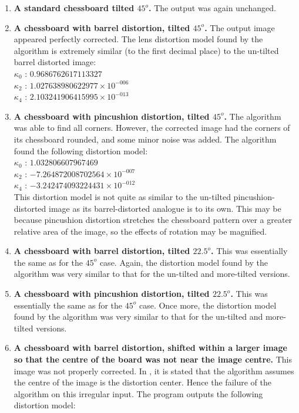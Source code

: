 \begin{enumerate}
  \item \textbf{A standard chessboard tilted $45^o$.} The output was again unchanged.
  \item \textbf{A chessboard with barrel distortion, tilted $45^o$.} The output image appeared perfectly corrected. The lens distortion model found by the algorithm is extremely similar (to the first decimal place) to the un-tilted barrel distorted image:\\
   $ \kappa_{0}$ : $0.9686762617113327$\\
   $ \kappa_{2}$ : $1.027638980622977 \times 10^{-006}$\\
   $ \kappa_{4}$ : $2.103241906415995 \times 10^{-013}$
  \item \textbf{A chessboard with pincushion distortion, tilted $45^o$.} The algorithm was able to find all corners. However, the corrected image had the corners of its chessboard rounded, and some minor noise was added. The algorithm found the following distortion model:\\
   $ \kappa_{0}$ : $1.032806607967469$\\
   $ \kappa_{2}$ : $-7.264872008702564 \times 10^{-007}$\\
   $ \kappa_{4}$ : $-3.242474093224431 \times 10^{-012}$\\
   This distortion model is not quite as similar to the un-tilted pincushion-distorted image as its barrel-distorted analogue is to its own. This may be because pincushion distortion stretches the chessboard pattern over a greater relative area of the image, so the effects of rotation may be magnified.
  \item \textbf{A chessboard with barrel distortion, tilted $22.5^o$.} This was essentially the same as for the $45^o$ case. Again, the distortion model found by the algorithm was very similar to that for the un-tilted and more-tilted versions.
  \item \textbf{A chessboard with pincushion distortion, tilted $22.5^o$.} This was essentially the same as for the $45^o$ case. Once more, the distortion model found by the algorithm was very similar to that for the un-tilted and more-tilted versions.
  \item \textbf{A chessboard with barrel distortion, shifted within a larger image so that the centre of the board was not near the image centre.} This image was not properly corrected. In \cite{algebraic-distortion}, it is stated that the algorithm assumes the centre of the image is the distortion center. Hence the failure of the algorithm on this irregular input. The program outputs the following distortion model:\\

\end{enumerate}
